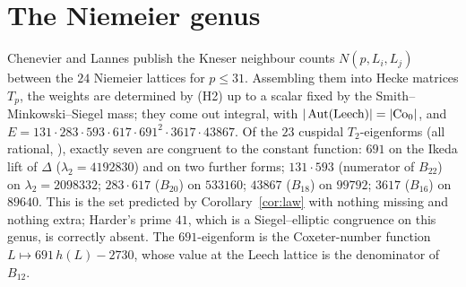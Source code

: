\documentclass[11pt]{amsart}
\theoremstyle{definition}
\begin{document}
\section{The Niemeier genus}\label{sec:niem}
Chenevier and Lannes \cite{CL} publish the Kneser neighbour counts $N(p,L_i,L_j)$ between the $24$ Niemeier lattices for $p\le31$. Assembling them into Hecke matrices $T_p$, the weights are determined by (H2) up to a scalar fixed by the Smith--Minkowski--Siegel mass; they come out integral, with $|\operatorname{Aut}(\text{Leech})|=|\mathrm{Co}_0|$, and $E=131\cdot283\cdot593\cdot617\cdot691^2\cdot3617\cdot43867$. Of the $23$ cuspidal $T_2$-eigenforms (all rational, \cite{NV}), exactly seven are congruent to the constant function: $691$ on the Ikeda lift of $\Delta$ ($\lambda_2=4192830$) and on two further forms; $131\cdot593$ (numerator of $B_{22}$) on $\lambda_2=2098332$; $283\cdot617$ ($B_{20}$) on $533160$; $43867$ ($B_{18}$) on $99792$; $3617$ ($B_{16}$) on $89640$. This is the set predicted by Corollary~\ref{cor:law} with nothing missing and nothing extra; Harder's prime $41$, which is a Siegel--elliptic congruence on this genus, is correctly absent. The $691$-eigenform is the Coxeter-number function $L\mapsto691\,h(L)-2730$, whose value at the Leech lattice is the denominator of $B_{12}$.
\end{document}
